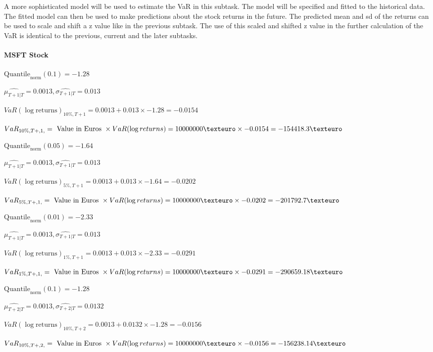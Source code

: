 A more sophisticated model will be used to estimate the VaR in this subtask. 
The model will be specified and fitted to the historical data. The fitted model can then be used to make predictions about the stock returns in the future. The predicted mean and sd of the returns can be used to scale and shift a z value like in the previous subtask.
The use of this scaled and shifted z value in the further calculation of the VaR is identical to the previous, current and the later subtasks.
\paragraph{MSFT Stock}


$\text{Quantile}_\text{norm}(0.1) = -1.28$

$\hat{\mu_{T+1|T}} = 0.0013, \hat{\sigma_{T+1|T}} = 0.013$

$VaR(\log \text{returns})_{10\%, T + 1} = 0.0013 + 0.013\times-1.28 = -0.0154$

$VaR_{10\%, T + ,1,} = \text{ Value in Euros } \times VaR(\log returns) = 10 000 000 \texteuro \times-0.0154 = -154418.3 \texteuro$


$\text{Quantile}_\text{norm}(0.05) = -1.64$

$\hat{\mu_{T+1|T}} = 0.0013, \hat{\sigma_{T+1|T}} = 0.013$

$VaR(\log \text{returns})_{5\%, T + 1} = 0.0013 + 0.013\times-1.64 = -0.0202$

$VaR_{5\%, T + ,1,} = \text{ Value in Euros } \times VaR(\log returns) = 10 000 000 \texteuro \times-0.0202 = -201792.7 \texteuro$


$\text{Quantile}_\text{norm}(0.01) = -2.33$

$\hat{\mu_{T+1|T}} = 0.0013, \hat{\sigma_{T+1|T}} = 0.013$

$VaR(\log \text{returns})_{1\%, T + 1} = 0.0013 + 0.013\times-2.33 = -0.0291$

$VaR_{1\%, T + ,1,} = \text{ Value in Euros } \times VaR(\log returns) = 10 000 000 \texteuro \times-0.0291 = -290659.18 \texteuro$


$\text{Quantile}_\text{norm}(0.1) = -1.28$

$\hat{\mu_{T+2|T}} = 0.0013, \hat{\sigma_{T+2|T}} = 0.0132$

$VaR(\log \text{returns})_{10\%, T + 2} = 0.0013 + 0.0132\times-1.28 = -0.0156$

$VaR_{10\%, T + ,2,} = \text{ Value in Euros } \times VaR(\log returns) = 10 000 000 \texteuro \times-0.0156 = -156238.14 \texteuro$


